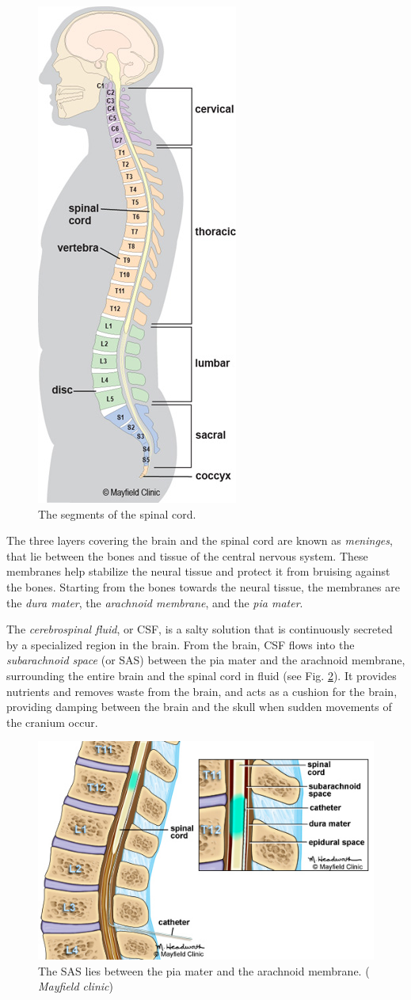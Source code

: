 \documentclass[a4paper,11pt,oneside]{book}
\begin{document}
\begin{figure}[h!]
\centering
\includegraphics[width=.3\textwidth]{images/spine}
\caption{The segments of the spinal cord.}
\label{img:cns:2}
\end{figure}


The three layers covering the brain and the spinal cord are known as \emph{meninges}, that lie between the bones and tissue of the central nervous system. These membranes help stabilize the neural tissue and protect it from bruising against the bones. Starting from the bones towards the neural tissue, the membranes are the \emph{dura mater}, the \emph{arachnoid membrane}, and the \emph{pia mater}.

The \emph{cerebrospinal fluid}, or CSF, is a salty solution that is continuously secreted by a specialized region in the brain. From the brain, CSF flows into the \emph{subarachnoid space} (or SAS) between the pia mater and the arachnoid membrane, surrounding the entire brain and the spinal cord in fluid (see Fig. \ref{img:cns:3}). It provides nutrients and removes waste from the brain, and acts as a cushion for the brain, providing damping between the brain and the skull when sudden movements of the cranium occur.


\begin{figure}[h!]
\centering
\includegraphics[width=.6\textwidth]{images/sas}
\caption{The SAS lies between the pia mater and the arachnoid membrane. (\textcopyright \emph{ Mayfield clinic})}
\label{img:cns:3}
\end{figure}
\end{document}
